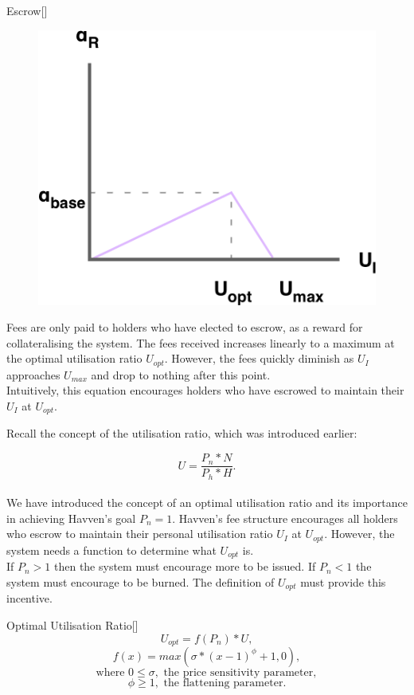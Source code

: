 \begin{namedthm*}{Escrow}[]
\begin{figure}[h!]
    \centering
    \includegraphics[width=.55\textwidth]{img/fees-received}
\end{figure}

\noindent Fees are only paid to \HAV{} holders who have elected to escrow, as a reward for collateralising the system. The fees received increases linearly to a maximum at the optimal utilisation ratio $U_{opt}$. However, the fees quickly diminish as $U_I$ approaches $U_{max}$ and drop to nothing after this point. \\

\noindent Intuitively, this equation encourages \HAV{} holders who have escrowed to maintain their $U_I$ at $U_{opt}$. 

\newpage

\noindent Recall the concept of the utilisation ratio, which was introduced earlier:

$$ U = \frac{P_n * N}{P_h * H}. $$ \\

\noindent We have introduced the concept of an optimal utilisation ratio and its importance in achieving Havven's  goal $P_n = 1$. Havven's fee structure encourages all \HAV{} holders who escrow to maintain their personal utilisation ratio $U_I$ at $U_{opt}$. However, the system needs a function to determine what $U_{opt}$ is. \\

\noindent If $P_n > 1$ then the system must encourage more \NOM{} to be issued. If $P_n < 1$ the system must encourage \NOM{} to be burned. The definition of $U_{opt}$ must provide this incentive. \\

\begin{namedthm}{Optimal Utilisation Ratio}[]
$$ U_{opt} = f(P_n) * U,$$
$$ f(x) = max(\sigma * (x - 1)^{\phi} + 1, 0), $$
$$\text{where } 0 \leq \sigma, \text{ the price sensitivity parameter}, $$
$$\phi \geq 1, \text{ the flattening parameter}. $$
\end{namedthm}


\end{namedthm*}
